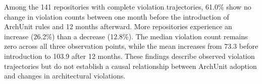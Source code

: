 


\begin{keyfinding}
Among the 141 repositories with complete violation trajectories, 61.0\% show no change in violation counts between one month before the introduction of ArchUnit rules and 12 months afterward. More repositories experience an increase (26.2\%) than a decrease (12.8\%). The median violation count remains zero across all three observation points, while the mean increases from 73.3 before introduction to 103.9 after 12 months. These findings describe observed violation trajectories but do not establish a causal relationship between ArchUnit adoption and changes in architectural violations.
\end{keyfinding}